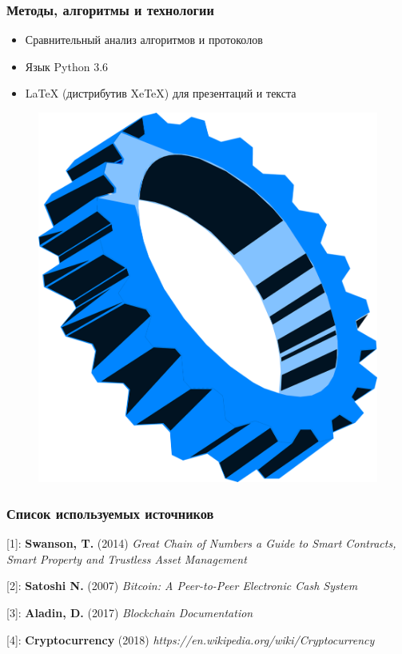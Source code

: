 \documentclass{beamer}
\begin{document}
\begin{frame}
    \frametitle{Методы, алгоритмы и технологии}
    \begin{multicols}{2}
        \begin{itemize}
            \item Сравнительный анализ алгоритмов и протоколов
            \item Язык Python 3.6
            \item {\LaTeX} (дистрибутив XeTeX) для презентаций и текста
        \end{itemize}
        \bigskip
        \columnbreak
        \begin{figure}
            \includegraphics[width=\columnwidth]{gear.png}
            \captionsetup{labelformat=empty}
        \end{figure}
    \end{multicols}
\end{frame}

\begin{frame}
    \frametitle{Список используемых источников}
    [1]: \textbf{Swanson, T.} (2014) \emph{Great Chain of Numbers a Guide to
    Smart Contracts, Smart Property and Trustless Asset Management}

    [2]: \textbf{Satoshi N.} (2007) \emph{Bitcoin: A Peer-to-Peer Electronic Cash System}

    [3]: \textbf{Aladin, D.} (2017) \emph{Blockchain Documentation}

    [4]: \textbf{Cryptocurrency} (2018)
    \emph{\small{https://en.wikipedia.org/wiki/Cryptocurrency}}

\end{frame}
\end{document}
